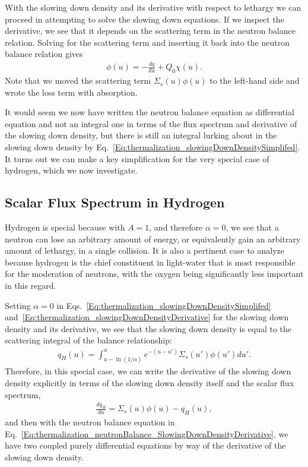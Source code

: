 With the slowing down density and its derivative with respect to lethargy we can proceed in attempting to solve the slowing down equations. If we inspect the derivative, we see that it depends on the scattering term in the neutron balance relation. Solving for the scattering term and inserting it back into the neutron balance relation gives
\begin{align}
  [ B^2 D(u) + \Sigma_a(u) ] \phi(u) = -\frac{dq}{du} + Q_0 \chi(u) . \label{Eq:thermalization_neutronBalance_SlowingDownDensityDerivative}
\end{align}
Note that we moved the scattering term $\Sigma_s(u) \phi(u)$ to the left-hand side and wrote the loss term with absorption.

It would seem we now have written the neutron balance equation as differential equation and not an integral one in terms of the flux spectrum and derivative of the slowing down density, but there is still an integral lurking about in the slowing down density by Eq.~\eqref{Eq:thermalization_slowingDownDensitySimplifed}. It turns out we can make a key simplification for the very special case of hydrogen, which we now investigate.

\subsection{Scalar Flux Spectrum in Hydrogen}

Hydrogen is special because with $A = 1$, and therefore $\alpha = 0$, we see that a neutron can lose an arbitrary amount of energy, or equivalently gain an arbitrary amount of lethargy, in a single collision. It is also a pertinent case to analyze because hydrogen is the chief constituent in light-water that is most responsible for the moderation of neutrons, with the oxygen being significantly less important in this regard.

Setting $\alpha = 0$ in Eqs.~\eqref{Eq:thermalization_slowingDownDensitySimplifed} and~\eqref{Eq:thermalization_slowingDownDensityDerivative} for the slowing down density and its derivative, we see that the slowing down density is equal to the scattering integral of the balance relationship:
\begin{align}
  q_H(u) = \int_{u-\ln(1/\alpha)}^{u} e^{-(u-u')} \Sigma_s(u') \phi(u') du' .
\end{align}
Therefore, in this special case, we can write the derivative of the slowing down density explicitly in terms of the slowing down density itself and the scalar flux spectrum,
\begin{align}
   \frac{dq_H}{du} = \Sigma_s(u) \phi(u) - q_H(u) , \label{Eq:thermalization_slowingDownDensityDerivative_Hydrogen}
\end{align}
and then with the neutron balance equation in Eq.~\eqref{Eq:thermalization_neutronBalance_SlowingDownDensityDerivative}, we have two coupled purely differential equations by way of the derivative of the slowing down density.

